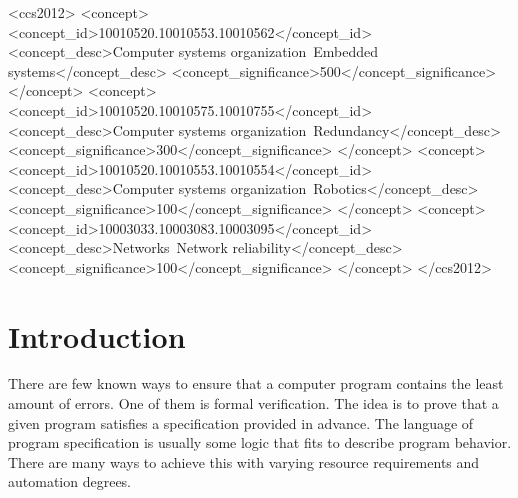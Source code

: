 \documentclass[sigplan,screen,review]{acmart}
\begin{document}
\begin{CCSXML}
<ccs2012>
 <concept>
  <concept_id>10010520.10010553.10010562</concept_id>
  <concept_desc>Computer systems organization~Embedded systems</concept_desc>
  <concept_significance>500</concept_significance>
 </concept>
 <concept>
  <concept_id>10010520.10010575.10010755</concept_id>
  <concept_desc>Computer systems organization~Redundancy</concept_desc>
  <concept_significance>300</concept_significance>
 </concept>
 <concept>
  <concept_id>10010520.10010553.10010554</concept_id>
  <concept_desc>Computer systems organization~Robotics</concept_desc>
  <concept_significance>100</concept_significance>
 </concept>
 <concept>
  <concept_id>10003033.10003083.10003095</concept_id>
  <concept_desc>Networks~Network reliability</concept_desc>
  <concept_significance>100</concept_significance>
 </concept>
</ccs2012>
\end{CCSXML}




\maketitle


\newcommand{\EM}[1]{\ensuremath{#1}}
\newcommand{\ssymbol}[1]{\EM{#1}}
\newcommand{\bnfdef}{\EM{\vcentcolon\vcentcolon=}}
\newcommand{\emphbf}[1]{\textbf{\emph{#1}}}
\newcommand{\spmid}{\EM{\ \mid \ }}
\newcommand{\vsample}[1]{\EM{\mathit{sample}(#1)}}
\newcommand{\vconst}{\EM{\mathsf{c}}}
\newcommand{\anyval}{\ssymbol{v}}
\newcommand{\anydist}{\ssymbol{d}}
\newcommand{\dnormal}[2]{\EM{\mathit{Normal}(#1,#2)}}
\newcommand{\duniform}[2]{\EM{\mathit{Uniform}(#1,#2)}}

\section{Introduction} 

There are few known ways to ensure that a computer program contains the least amount of errors. One of them is formal verification. The idea is to prove that a given program satisfies a specification provided in advance. The language of program specification is usually some logic that fits to describe program behavior. There are many ways to achieve this with varying resource requirements and automation degrees.
\end{document}
